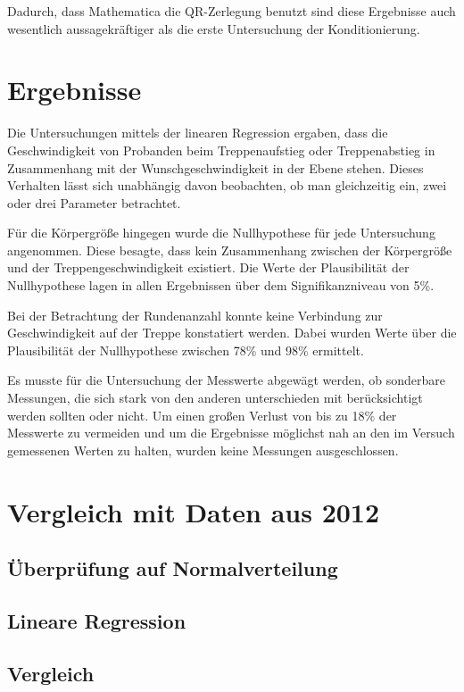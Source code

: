 	Dadurch, dass Mathematica die QR-Zerlegung benutzt sind diese Ergebnisse auch wesentlich aussagekräftiger als die erste Untersuchung der Konditionierung.
	
	
	
	\section{Ergebnisse}
	Die Untersuchungen mittels der linearen Regression ergaben, dass die Geschwindigkeit von Probanden beim Treppenaufstieg oder Treppenabstieg in Zusammenhang mit der Wunschgeschwindigkeit in der Ebene stehen. Dieses Verhalten lässt sich unabhängig davon beobachten, ob man gleichzeitig ein, zwei oder drei Parameter betrachtet.
	
	Für die Körpergröße hingegen wurde die Nullhypothese für jede Untersuchung angenommen. Diese besagte, dass kein Zusammenhang zwischen der Körpergröße und der Treppengeschwindigkeit existiert. Die Werte der Plausibilität der Nullhypothese lagen in allen Ergebnissen über dem Signifikanzniveau von 5\%.
	
	Bei der Betrachtung der Rundenanzahl konnte keine Verbindung zur Geschwindigkeit auf der Treppe konstatiert werden. Dabei wurden Werte über die Plausibilität der Nullhypothese zwischen 78\% und 98\% ermittelt.
	
	Es musste für die Untersuchung der Messwerte abgewägt werden, ob sonderbare Messungen, die sich stark von den anderen unterschieden mit berücksichtigt werden sollten oder nicht. Um einen großen Verlust von bis zu 18\% der Messwerte zu vermeiden und um die Ergebnisse möglichst nah an den im Versuch gemessenen Werten zu halten, wurden keine Messungen ausgeschlossen.
	
	\section{Vergleich mit Daten aus 2012}
	\subsection{Überprüfung auf Normalverteilung}
	\subsection{Lineare Regression}
	\subsection{Vergleich}
	

